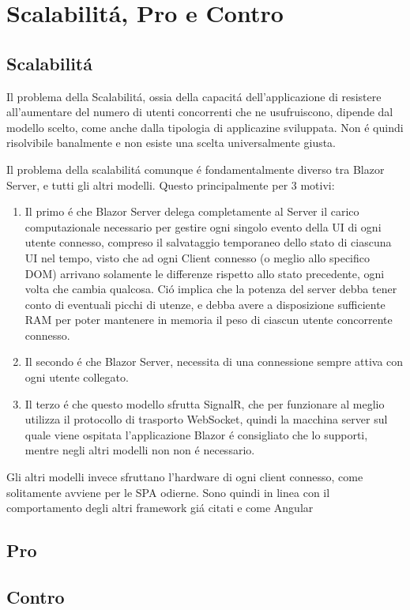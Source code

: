 \chapter{Scalabilit\'a, Pro e Contro}\label{cap:scalprocont}
\section{Scalabilit\'a}\label{sez:scalabilita}
Il problema della Scalabilit\'a, ossia della capacit\'a dell'applicazione di resistere all'aumentare del numero di utenti concorrenti che ne usufruiscono, dipende dal modello scelto, come anche dalla tipologia di applicazine sviluppata.
Non \'e quindi risolvibile banalmente e non esiste una scelta universalmente giusta.

Il problema della scalabilit\'a comunque \'e fondamentalmente diverso tra Blazor Server, e tutti gli altri modelli.
Questo principalmente per 3 motivi:
\begin{enumerate}
	\item Il primo \'e che Blazor Server delega completamente al Server il carico computazionale necessario per gestire ogni singolo evento della UI di ogni utente connesso, compreso il salvataggio temporaneo dello stato di ciascuna UI nel tempo, visto che ad ogni Client connesso (o meglio allo specifico DOM) arrivano solamente le differenze rispetto allo stato precedente, ogni volta che cambia qualcosa.
	Ci\'o implica che la potenza del server debba tener conto di eventuali picchi di utenze, e debba avere a disposizione sufficiente RAM per poter mantenere in memoria il peso di ciascun utente concorrente connesso.
	
	\item Il secondo \'e che Blazor Server, necessita di una connessione sempre attiva con ogni utente collegato.
	
	\item Il terzo \'e che questo modello sfrutta SignalR, che per funzionare al meglio utilizza il protocollo di trasporto WebSocket, quindi la macchina server sul quale viene ospitata l'applicazione Blazor \'e consigliato che lo supporti, mentre negli altri modelli non non \'e necessario.
\end{enumerate}

Gli altri modelli invece sfruttano l'hardware di ogni client connesso, come solitamente avviene per le SPA odierne.
Sono quindi in linea con il comportamento degli altri framework gi\'a citati e come Angular

\section{Pro}\label{sez:pro}


\section{Contro}\label{sez:contro}